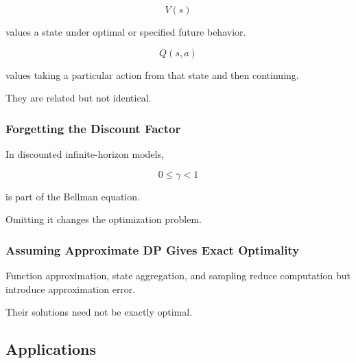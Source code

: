 \[
V(s)
\]

values a state under optimal or specified future behavior.

\[
Q(s,a)
\]

values taking a particular action from that state and then continuing.

They are related but not identical.

\subsubsection{Forgetting the Discount Factor}

In discounted infinite-horizon models,

\[
0\leq\gamma<1
\]

is part of the Bellman equation.

Omitting it changes the optimization problem.

\subsubsection{Assuming Approximate DP Gives Exact Optimality}

Function approximation, state aggregation, and sampling reduce
computation but introduce approximation error.

Their solutions need not be exactly optimal.

\subsection{Applications}
\label{subsec:dynamic-programming-applications}

